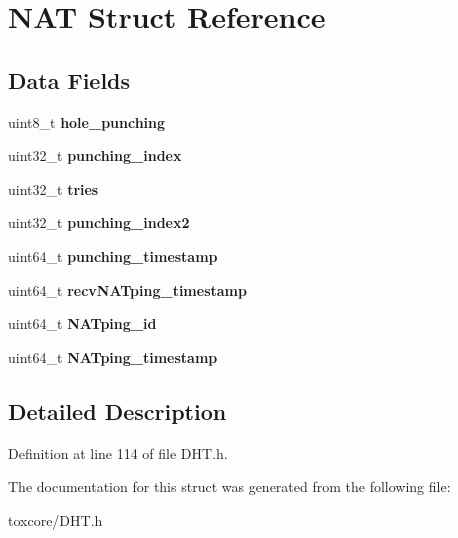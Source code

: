 \hypertarget{struct_n_a_t}{\section{N\+A\+T Struct Reference}
\label{struct_n_a_t}
}
\subsection*{Data Fields}
\begin{DoxyCompactItemize}
\item 
\hypertarget{struct_n_a_t_a40495f11f0e91fcea43d57248e202ea3}{uint8\+\_\+t {\bfseries hole\+\_\+punching}}\label{struct_n_a_t_a40495f11f0e91fcea43d57248e202ea3}

\item 
\hypertarget{struct_n_a_t_aeb4b0f7724adb0857b15e0f34e95ecca}{uint32\+\_\+t {\bfseries punching\+\_\+index}}\label{struct_n_a_t_aeb4b0f7724adb0857b15e0f34e95ecca}

\item 
\hypertarget{struct_n_a_t_a852b5b4a6ac0e351887ab6dde3e3fcc5}{uint32\+\_\+t {\bfseries tries}}\label{struct_n_a_t_a852b5b4a6ac0e351887ab6dde3e3fcc5}

\item 
\hypertarget{struct_n_a_t_a1d36817a78a0e261e7ca0982e17aa4ee}{uint32\+\_\+t {\bfseries punching\+\_\+index2}}\label{struct_n_a_t_a1d36817a78a0e261e7ca0982e17aa4ee}

\item 
\hypertarget{struct_n_a_t_ab8cadc230283568e7aeb303691d8e374}{uint64\+\_\+t {\bfseries punching\+\_\+timestamp}}\label{struct_n_a_t_ab8cadc230283568e7aeb303691d8e374}

\item 
\hypertarget{struct_n_a_t_a237df5177fc9db865722933b5b6468ea}{uint64\+\_\+t {\bfseries recv\+N\+A\+Tping\+\_\+timestamp}}\label{struct_n_a_t_a237df5177fc9db865722933b5b6468ea}

\item 
\hypertarget{struct_n_a_t_addd9408d04ff8e05c569651b299f1b1b}{uint64\+\_\+t {\bfseries N\+A\+Tping\+\_\+id}}\label{struct_n_a_t_addd9408d04ff8e05c569651b299f1b1b}

\item 
\hypertarget{struct_n_a_t_a20937663f98914b69bb73f938deed531}{uint64\+\_\+t {\bfseries N\+A\+Tping\+\_\+timestamp}}\label{struct_n_a_t_a20937663f98914b69bb73f938deed531}

\end{DoxyCompactItemize}


\subsection{Detailed Description}


Definition at line 114 of file D\+H\+T.\+h.



The documentation for this struct was generated from the following file\+:\begin{DoxyCompactItemize}
\item 
toxcore/D\+H\+T.\+h\end{DoxyCompactItemize}
